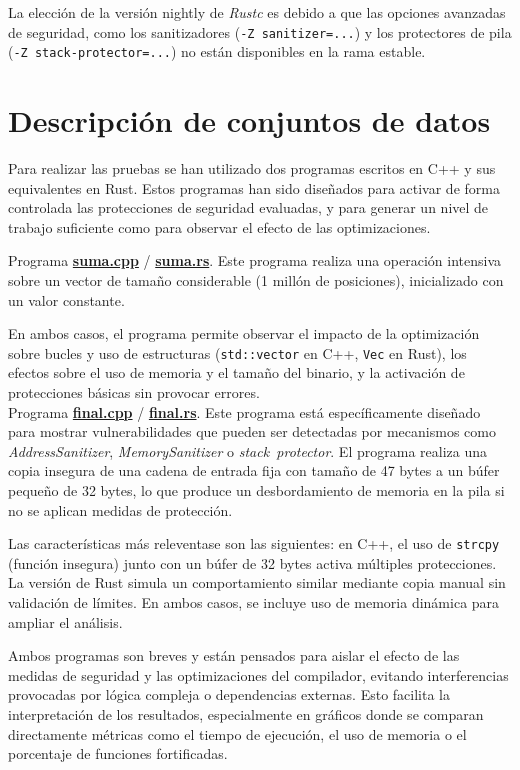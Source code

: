 La elección de la versión nightly de \emph{Rustc} es debido a que las
opciones avanzadas de seguridad, como los sanitizadores
(\texttt{-Z\ sanitizer=...}) y los protectores de pila
(\texttt{-Z\ stack-protector=...}) no están disponibles en la rama
estable.

\section{Descripción de conjuntos de datos}

Para realizar las pruebas se han utilizado dos programas escritos en C++
y sus equivalentes en Rust. Estos programas han sido diseñados para
activar de forma controlada las protecciones de seguridad evaluadas, y
para generar un nivel de trabajo suficiente como para observar el efecto
de las optimizaciones.


Programa \underline{\textbf{suma.cpp}} / \underline{\textbf{suma.rs}}.
Este programa realiza una operación intensiva sobre un vector de tamaño
considerable (1 millón de posiciones), inicializado con un valor
constante.

En ambos casos, el programa permite observar el impacto de la optimización
sobre bucles y uso de estructuras (\texttt{std::vector} en C++, \texttt{Vec} en Rust), 
los efectos sobre el uso de memoria y el tamaño del binario, y la activación de protecciones
básicas sin provocar errores.\\

Programa \underline{\textbf{final.cpp}} / \underline{\textbf{final.rs}}.
Este programa está específicamente diseñado para mostrar
vulnerabilidades que pueden ser detectadas por mecanismos como
\emph{AddressSanitizer}, \emph{MemorySanitizer} o
\emph{stack\ protector}. El programa realiza una copia insegura de una cadena de 
entrada fija con tamaño de 47 bytes a un búfer pequeño de 32 bytes, 
lo que produce un desbordamiento de memoria en la pila si 
no se aplican medidas de protección.

Las características más releventase son las siguientes: en C++, el uso de 
\texttt{strcpy} (función insegura) junto con un búfer de 32 bytes 
activa múltiples protecciones. La versión de Rust simula un comportamiento 
similar mediante copia manual sin validación de límites. En ambos casos, se 
incluye uso de memoria dinámica para ampliar el análisis.

\bigskip

Ambos programas son breves y están pensados para aislar el efecto de las
medidas de seguridad y las optimizaciones del compilador, evitando
interferencias provocadas por lógica compleja o dependencias externas.
Esto facilita la interpretación de los resultados, especialmente en
gráficos donde se comparan directamente métricas como el tiempo de
ejecución, el uso de memoria o el porcentaje de funciones fortificadas.


